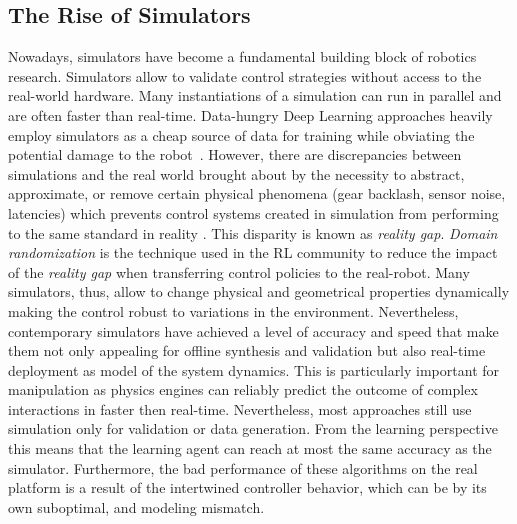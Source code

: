 \subsection{The Rise of Simulators}
Nowadays, simulators have become a fundamental building block of robotics research. Simulators allow to validate control strategies without access to the real-world hardware. Many instantiations of a simulation can run in parallel and are often faster than real-time. Data-hungry Deep Learning approaches heavily employ simulators as a cheap source of data for training while obviating the potential damage to the robot~\cite{liang_gpu-accelerated_2018}. However, there are discrepancies between simulations and the real world brought about by the necessity to abstract, approximate, or remove certain physical phenomena (gear backlash, sensor noise, latencies) which prevents control systems created in simulation from performing to the same standard in reality \cite{collins_benchmarking_2020}. This disparity is known as \emph{reality gap}. \emph{Domain randomization} is the technique used in the RL community to reduce the impact of the \emph{reality gap} when transferring control policies to the real-robot. Many simulators, thus, allow to change physical and geometrical properties dynamically making the control robust to variations in the environment. Nevertheless, contemporary simulators have achieved a level of accuracy and speed that make them not only appealing for offline synthesis and validation but also real-time deployment as model of the system dynamics. This is particularly important for manipulation as physics engines can reliably predict the outcome of complex interactions in faster then real-time. Nevertheless, most approaches still use simulation only for validation or data generation. From the learning perspective this means that the learning agent can reach at most the same accuracy as the simulator. Furthermore, the bad performance of these algorithms on the real platform is a result of the intertwined controller behavior, which can be by its own suboptimal, and modeling mismatch.   

